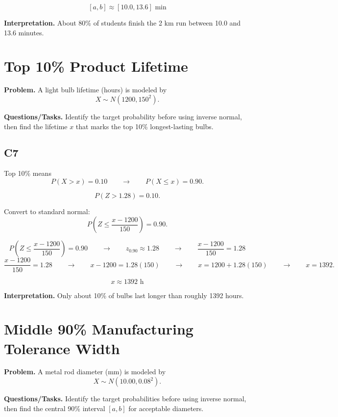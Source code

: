 	\[
	[a,b] \approx [10.0, 13.6]\text{ min}
	\]
	
	\textbf{Interpretation.} About 80\% of students finish the 2 km run between 10.0 and 13.6 minutes.
	
	\section{Top 10\% Product Lifetime}
	
	\textbf{Problem.} A light bulb lifetime (hours) is modeled by
	\[
	X \sim N(1200, 150^2).
	\]
	
	\textbf{Questions/Tasks.} Identify the target probability before using inverse normal, then find the lifetime $x$ that marks the top 10\% longest-lasting bulbs.
	
	\subsection*{C7}
	
	Top 10\% means
	\[
	P(X > x) = 0.10
	\qquad \longrightarrow \qquad
	P(X \leq x) = 0.90.
	\]
	
	\[
	P(Z>1.28)=0.10.
	\]
	
	
	Convert to standard normal:
	\[
	P\left(Z \leq \frac{x - 1200}{150}\right) = 0.90.
	\]
	
	\[
	P\left(Z \leq \frac{x - 1200}{150}\right)=0.90
	\qquad \longrightarrow \qquad
	z_{0.90}\approx 1.28
	\qquad \longrightarrow \qquad
	\frac{x - 1200}{150}=1.28
	\]
	\[
	\frac{x - 1200}{150}=1.28
	\qquad \longrightarrow \qquad
	x-1200=1.28(150)
	\qquad \longrightarrow \qquad
	x=1200+1.28(150)
	\qquad \longrightarrow \qquad
	x=1392.
	\]
	
	\[
	x \approx 1392\text{ h}
	\]
	
	\textbf{Interpretation.} Only about 10\% of bulbs last longer than roughly 1392 hours.
	
	\section{Middle 90\% Manufacturing Tolerance Width}
	
	\textbf{Problem.} A metal rod diameter (mm) is modeled by
	\[
	X \sim N(10.00, 0.08^2).
	\]
	
	\textbf{Questions/Tasks.} Identify the target probabilities before using inverse normal, then find the central 90\% interval $[a,b]$ for acceptable diameters.
	
